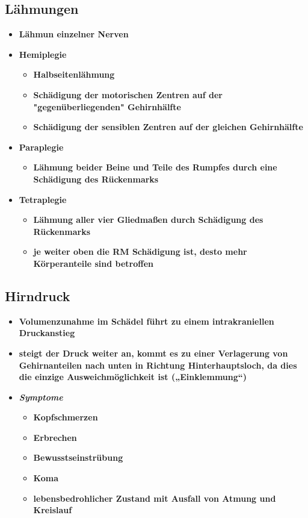 	\subsection{Lähmungen}
		\begin{itemize}
			\item \textbf{Lähmun einzelner Nerven}
			\item \textbf{Hemiplegie}
				\begin{itemize}
					\item \textbf{Halbseitenlähmung}
					\item \textbf{Schädigung der motorischen Zentren auf der "gegenüberliegenden" Gehirnhälfte}
					\item \textbf{Schädigung der sensiblen Zentren auf der gleichen Gehirnhälfte}
				\end{itemize}
			\item \textbf{Paraplegie}
				\begin{itemize}
					\item \textbf{Lähmung beider Beine und Teile des Rumpfes durch eine Schädigung des Rückenmarks}
				\end{itemize}
			\item \textbf{Tetraplegie}
				\begin{itemize}
					\item \textbf{Lähmung aller vier Gliedmaßen durch Schädigung des Rückenmarks}
					\item \textbf{je weiter oben die RM Schädigung ist, desto mehr Körperanteile sind betroffen}
				\end{itemize}
		\end{itemize}
	\subsection{Hirndruck}
		\begin{itemize}
			\item \textbf{Volumenzunahme im Schädel führt zu einem intrakraniellen Druckanstieg}
			\item \textbf{steigt der Druck weiter an, kommt es zu einer Verlagerung von Gehirnanteilen nach unten in Richtung Hinterhauptsloch, da dies die einzige Ausweichmöglichkeit ist („Einklemmung“)}
			\item \textit{\textbf{Symptome}}
				\begin{itemize}
					\item \textbf{Kopfschmerzen}
					\item \textbf{Erbrechen}
					\item \textbf{Bewusstseinstrübung}
					\item \textbf{Koma}
					\item \textbf{lebensbedrohlicher Zustand mit Ausfall von Atmung und Kreislauf}
				\end{itemize}
		\end{itemize}
